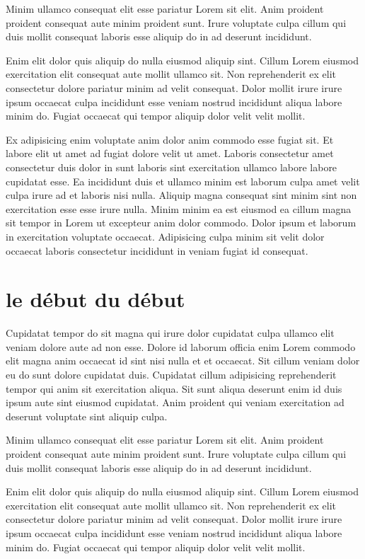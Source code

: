\documentclass[a4paper,10pt,french]{sphinxmanual}
\begin{document}
Minim ullamco consequat elit esse pariatur Lorem sit elit. Anim proident proident consequat aute minim proident sunt. Irure voluptate culpa cillum qui duis mollit consequat laboris esse aliquip do in ad deserunt incididunt.

Enim elit dolor quis aliquip do nulla eiusmod aliquip sint. Cillum Lorem eiusmod exercitation elit consequat aute mollit ullamco sit. Non reprehenderit ex elit consectetur dolore pariatur minim ad velit consequat. Dolor mollit irure irure ipsum occaecat culpa incididunt esse veniam nostrud incididunt aliqua labore minim do. Fugiat occaecat qui tempor aliquip dolor velit velit mollit.

Ex adipisicing enim voluptate anim dolor anim commodo esse fugiat sit. Et labore elit ut amet ad fugiat dolore velit ut amet. Laboris consectetur amet consectetur duis dolor in sunt laboris sint exercitation ullamco labore labore cupidatat esse. Ea incididunt duis et ullamco minim est laborum culpa amet velit culpa irure ad et laboris nisi nulla. Aliquip magna consequat sint minim sint non exercitation esse esse irure nulla. Minim minim ea est eiusmod ea cillum magna sit tempor in Lorem ut excepteur anim dolor commodo. Dolor ipsum et laborum in exercitation voluptate occaecat. Adipisicing culpa minim sit velit dolor occaecat laboris consectetur incididunt in veniam fugiat id consequat.


\section{le début du début}
\label{\detokenize{docs/refs/autocad-refs:le-debut-du-debut}}
Cupidatat tempor do sit magna qui irure dolor cupidatat culpa ullamco elit veniam dolore aute ad non esse. Dolore id laborum officia enim Lorem commodo elit magna anim occaecat id sint nisi nulla et et occaecat. Sit cillum veniam dolor eu do sunt dolore cupidatat duis. Cupidatat cillum adipisicing reprehenderit tempor qui anim sit exercitation aliqua. Sit sunt aliqua deserunt enim id duis ipsum aute sint eiusmod cupidatat. Anim proident qui veniam exercitation ad deserunt voluptate sint aliquip culpa.

Minim ullamco consequat elit esse pariatur Lorem sit elit. Anim proident proident consequat aute minim proident sunt. Irure voluptate culpa cillum qui duis mollit consequat laboris esse aliquip do in ad deserunt incididunt.

Enim elit dolor quis aliquip do nulla eiusmod aliquip sint. Cillum Lorem eiusmod exercitation elit consequat aute mollit ullamco sit. Non reprehenderit ex elit consectetur dolore pariatur minim ad velit consequat. Dolor mollit irure irure ipsum occaecat culpa incididunt esse veniam nostrud incididunt aliqua labore minim do. Fugiat occaecat qui tempor aliquip dolor velit velit mollit.
\end{document}
